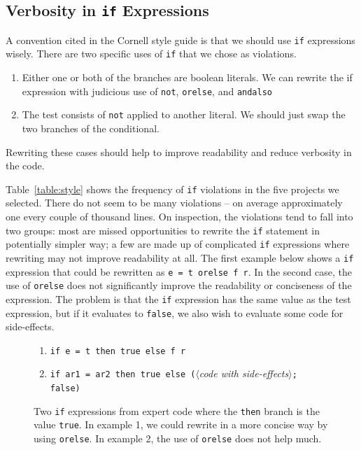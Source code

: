 \documentclass[12pt,abstracton]{scrartcl}
\begin{document}
\subsection{Verbosity in \texttt{if} Expressions}
A convention cited in the Cornell style guide is that we should use \texttt{if}
expressions wisely. There are two specific uses of \texttt{if} that we
chose as violations.
\begin{enumerate}
\item Either one or both of the branches are boolean literals. We can rewrite the if expression with judicious use of \texttt{not}, \texttt{orelse}, and \texttt{andalso}
\item The test consists of \texttt{not} applied to another literal. We should just swap the two branches of the conditional.
\end{enumerate}
Rewriting these cases should help to improve readability and reduce verbosity in the code.

Table~\ref{table:style} shows the frequency of \texttt{if} violations in the five projects we selected.
There do not seem to be many violations -- on average approximately one every couple of thousand lines.
On inspection, the violations tend to fall into two groups: most are
missed opportunities to rewrite the \texttt{if} statement in potentially simpler way;
a few are made up of complicated \texttt{if} expressions where rewriting may not improve readability at all.
The first example below shows a \texttt{if} expression that could be rewritten as \texttt{e = t orelse f r}.
In the second case, the use of \texttt{orelse} does not significantly improve the readability or conciseness
of the expression. The problem is that the \texttt{if} expression has the same value as the test expression,
but if it evaluates to \texttt{false}, we also wish to evaluate some code for side-effects.

\begin{figure}[h!]
\begin{enumerate}
\item \texttt{if e = t then true else f r}
\item \texttt{if ar1 = ar2 then true else (}$\langle$\emph{code with side-effects}$\rangle$\texttt{; false)}
\end{enumerate}
\caption{Two \texttt{if} expressions from expert code where the \texttt{then} branch is the value \texttt{true}. In example 1, we could
rewrite in a more concise way by using \texttt{orelse}. In example 2, the use of \texttt{orelse} does not help much.}
\label{figure:ifthentrue}
\end{figure}
\end{document}

